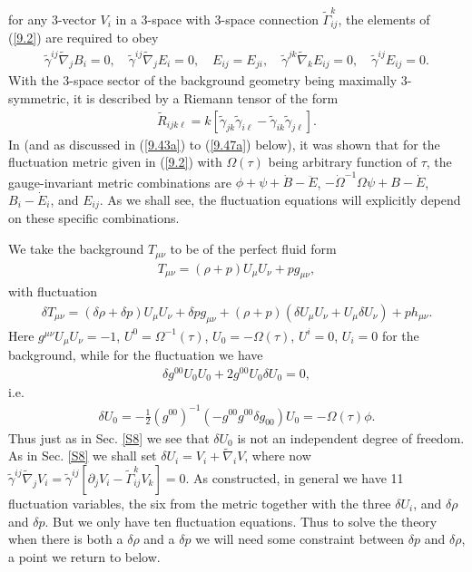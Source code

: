 \documentclass[aps,onecolumn,10pt]{revtex4}
\numberwithin{equation}{section}
\numberwithin{equation}{section}
\begin{document}
%
for any 3-vector $V_i$ in a 3-space with 3-space connection $\tilde{\Gamma}^{k}_{ij}$, the elements of (\ref{9.2}) are required to obey
%
\begin{eqnarray}
\tilde{\gamma}^{ij}\tilde{\nabla}_j B_i = 0,\quad \tilde{\gamma}^{ij}\tilde{\nabla}_j E_i = 0, \quad E_{ij}=E_{ji},\quad \tilde{\gamma}^{jk}\tilde{\nabla}_kE_{ij} = 0, \quad\tilde{\gamma}^{ij}E_{ij} = 0.
\label{9.4}
\end{eqnarray}
%
With the  3-space sector of the background geometry being maximally 3-symmetric, it is described by a Riemann tensor of the form
%
\begin{eqnarray}
\tilde{R}_{ijk\ell}=k[\tilde{\gamma}_{jk}\tilde{\gamma}_{i\ell}-\tilde{\gamma}_{ik}\tilde{\gamma}_{j\ell}].
\label{9.5}
\end{eqnarray}
%
In \cite{Amarasinghe2018} (and as discussed in (\ref{9.43a}) to (\ref{9.47a}) below), it was shown that for the fluctuation metric given in (\ref{9.2}) with $\Omega(\tau)$ being arbitrary function of $\tau$, the gauge-invariant metric combinations are $\phi + \psi + \dot B - \ddot E$, $ - \dot\Omega^{-1}\Omega \psi + B - \dot E$, $B_i-\dot{E}_i$, and $E_{ij}$. As we shall see, the fluctuation equations will explicitly depend on these specific combinations.



We take the background $T_{\mu\nu}$ to be of the perfect fluid form
%
\begin{eqnarray}
T_{\mu\nu}=(\rho+p)U_{\mu}U_{\nu}+pg_{\mu\nu},
\label{9.6}
\end{eqnarray}
%
with fluctuation
%
\begin{eqnarray}
\delta T_{\mu\nu}=(\delta\rho+\delta p)U_{\mu}U_{\nu}+\delta pg_{\mu\nu}+(\rho+p)(\delta U_{\mu}U_{\nu}+U_{\mu}\delta U_{\nu})+ph_{\mu\nu}.
\label{9.7}
\end{eqnarray}
%
Here  $g^{\mu\nu}U_{\mu}U_{\nu}=-1$, $U^{0}=\Omega^{-1}(\tau)$, $U_0=-\Omega(\tau)$, $U^{i}=0$, $U_i=0$ for the background, while for the fluctuation we have 
%
\begin{eqnarray}
 \delta g^{00}U_{0}U_{0}+2g^{00}U_{0}\delta U_{0}=0,
\label{9.8}
\end{eqnarray}
%
i.e. 
%
\begin{eqnarray}
\delta U_{0}=-\frac{1}{2}(g^{00})^{-1}(-g^{00}g^{00}\delta g_{00})U_{0}=-\Omega(\tau)\phi.
\label{9.9}
\end{eqnarray}
%
Thus just as in Sec. \ref{S8} we see that $\delta U_0$ is not an independent degree of freedom. As in Sec. \ref{S8} we shall set $\delta U_i=V_i+\tilde{\nabla}_iV$, where now $\tilde{\gamma}^{ij}\tilde{\nabla}_j V_i=\tilde{\gamma}^{ij}[\partial_j V_i-\tilde{\Gamma}^{k}_{ij}V_k]=0$. As constructed, in general we have 11 fluctuation variables, the six from the metric together with the three $\delta U_i$, and $\delta\rho$ and $\delta p$. But we only have ten fluctuation equations. Thus to solve the theory when there is both a $\delta \rho$ and a $\delta p$ we will need some constraint between $\delta p$ and $\delta \rho$, a point we return to below.
\end{document}
